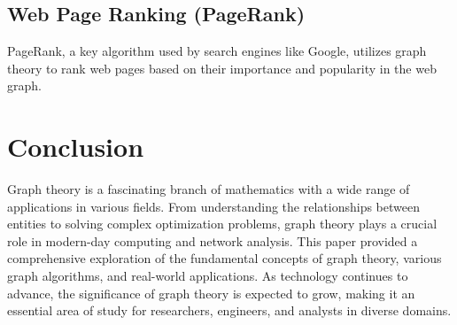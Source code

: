 \documentclass{article}
\begin{document}
\subsection{Web Page Ranking (PageRank)}
PageRank, a key algorithm used by search engines like Google, utilizes graph theory to rank web pages based on their importance and popularity in the web graph.

\section{Conclusion}
Graph theory is a fascinating branch of mathematics with a wide range of applications in various fields. From understanding the relationships between entities to solving complex optimization problems, graph theory plays a crucial role in modern-day computing and network analysis. This paper provided a comprehensive exploration of the fundamental concepts of graph theory, various graph algorithms, and real-world applications. As technology continues to advance, the significance of graph theory is expected to grow, making it an essential area of study for researchers, engineers, and analysts in diverse domains.
\end{document}
